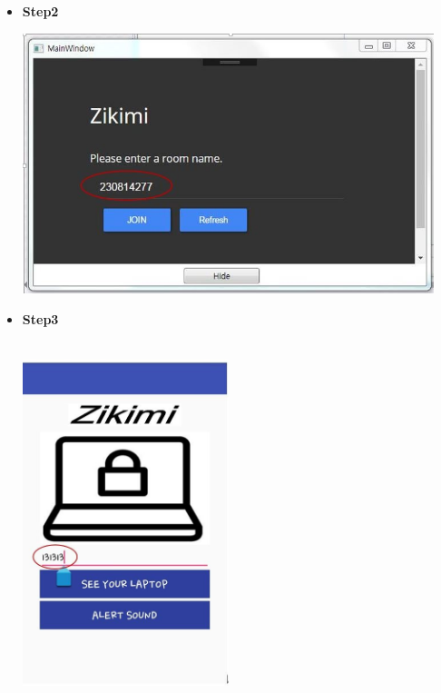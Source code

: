 \documentclass[12pt]{article}
\begin{document}
\begin{itemize}

\item\textbf{Step2}\\ 
\begin{center}
\includegraphics[width=120mm,scale=1.8]{streamingstep2}
\end{center}
\newpage
\item\textbf{Step3}\\
 \\ 

\begin{center} 
\includegraphics[width=60mm,scale=1]{streamingstep3}
\end{center}


\end{itemize}
\end{document}

